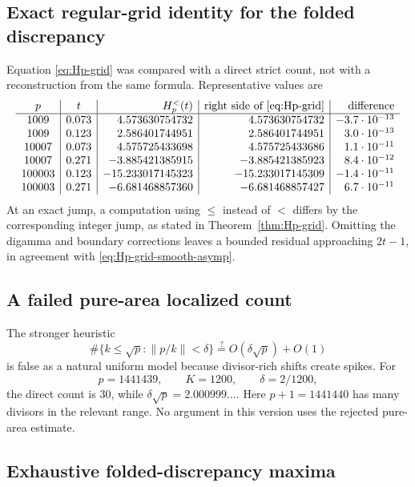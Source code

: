 \documentclass[11pt]{amsart}
\numberwithin{equation}{section}
\theoremstyle{definition}
\theoremstyle{remark}
\begin{document}
\subsection{Exact regular-grid identity for the folded discrepancy}

Equation \eqref{eq:Hp-grid} was compared with a direct strict count, not
with a reconstruction from the same formula.  Representative values are
\[
\begin{array}{c|c|r|r|r}
 p&t&H_p^{<}(t)&\text{right side of \eqref{eq:Hp-grid}}&\text{difference}\\ \hline
1009&0.073& 4.573630754732& 4.573630754732&-3.7\cdot10^{-13}\\
1009&0.123& 2.586401744951& 2.586401744951& 3.0\cdot10^{-13}\\
10007&0.073&4.575725433698&4.575725433686&1.1\cdot10^{-11}\\
10007&0.271&-3.885421385915&-3.885421385923&8.4\cdot10^{-12}\\
100003&0.123&-15.233017145323&-15.233017145309&-1.4\cdot10^{-11}\\
100003&0.271&-6.681468857360&-6.681468857427&6.7\cdot10^{-11}
\end{array}
\]
At an exact jump, a computation using \(\le\) instead of \(<\) differs by
the corresponding integer jump, as stated in
Theorem~\ref{thm:Hp-grid}.  Omitting the digamma and boundary corrections
leaves a bounded residual approaching \(2t-1\), in agreement with
\eqref{eq:Hp-grid-smooth-asymp}.

\subsection{A failed pure-area localized count}

The stronger heuristic
\[
 \#\{k\le\sqrt p:\|p/k\|<\delta\}
 \stackrel{?}{=}O(\delta\sqrt p)+O(1)
\]
is false as a natural uniform model because divisor-rich shifts create
spikes.  For
\[
 p=1441439,\qquad K=1200,\qquad \delta=2/1200,
\]
the direct count is \(30\), while \(\delta\sqrt p=2.000999\ldots\).
Here \(p+1=1441440\) has many divisors in the relevant range.  No argument
in this version uses the rejected pure-area estimate.

\subsection{Exhaustive folded-discrepancy maxima}
\end{document}
